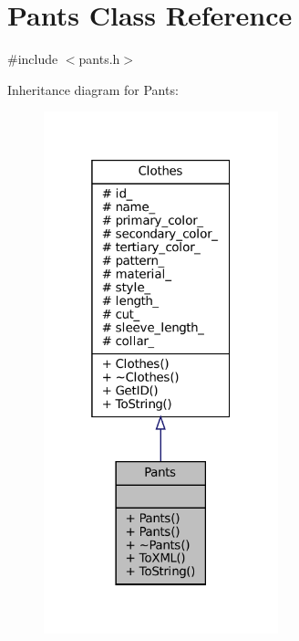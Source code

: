 \hypertarget{classPants}{}\section{Pants Class Reference}
\label{classPants}


{\ttfamily \#include $<$pants.\+h$>$}



Inheritance diagram for Pants\+:\nopagebreak
\begin{figure}[H]
\begin{center}
\leavevmode
\includegraphics[width=193pt]{classPants__inherit__graph}
\end{center}
\end{figure}


